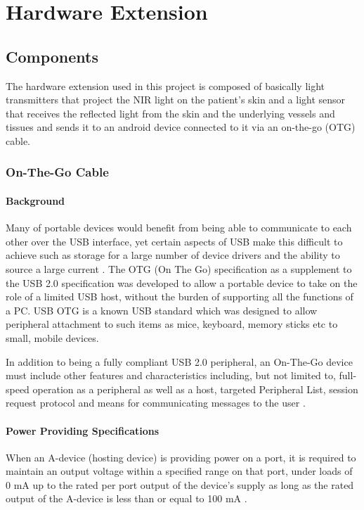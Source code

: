 
\chapter{Hardware Extension}\label{chapter:Hardware Extension}

\section{Components }
The hardware extension used in this project is composed of basically light transmitters that project the NIR light on the patient’s skin and a light sensor that receives the reflected light from the skin and the underlying vessels and tissues and sends it to an android device connected to it via an on-the-go (OTG) cable.

\subsection{On-The-Go Cable}
\subsubsection{Background}
Many of portable devices would benefit from being able to communicate to each other over the USB interface, yet certain aspects of USB make this difficult to achieve such as storage for a large number of device drivers and the ability to source a large current \parencite{otg}.
The OTG (On The Go) specification as a supplement to the USB 2.0 specification was developed to allow a portable device to take on the role of a limited USB host, without the burden of supporting all the functions of a PC.
USB OTG is a known USB standard which was designed to allow peripheral attachment to such items as mice, keyboard, memory sticks etc to small, mobile devices.

In addition to being a fully compliant USB 2.0 peripheral, an On-The-Go device must include other features and characteristics including, but not limited to, full-speed operation as a peripheral as well as a host, targeted Peripheral List, session request protocol and means for communicating messages to the user \parencite{otg}.

\subsubsection{Power Providing Specifications}
When an A-device (hosting device) is providing power on a port, it is required to maintain an output voltage within a specified range on that port, under loads of 0 mA up to the rated per port output of the device’s supply as long as the rated output of the A-device is less than or equal to 100 mA \parencite{otg}.

